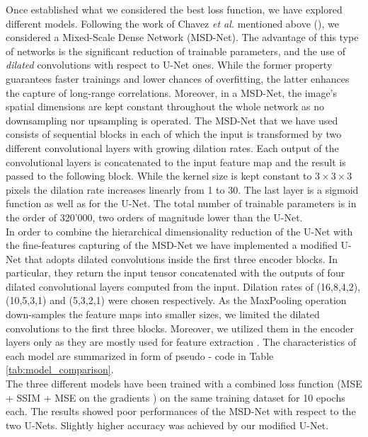Once established what we considered the best loss function, we have explored different models. 
Following the work of Chavez \textit{et al.} mentioned above (\cite{chavez_comparison_2022}), we considered a 
Mixed-Scale Dense Network (MSD-Net). The advantage of this type of networks is the significant reduction of trainable
parameters, and the use of \textit{dilated} convolutions with respect to U-Net ones. While the former property guarantees
faster trainings and lower chances of overfitting, the latter enhances the capture of long-range correlations. Moreover, 
in a MSD-Net, the image's spatial dimensions are kept constant throughout the whole network as no downsampling nor upsampling is operated.
The MSD-Net that we have used consists of sequential blocks in each of which the input is transformed by two different 
convolutional layers with growing dilation rates. Each output of the convolutional layers is concatenated to the input 
feature map and the result is passed to the following block. While the kernel size is kept constant to $3\times3\times3$ pixels
the dilation rate increases linearly from 1 to 30. The last layer is a sigmoid function as well as for the U-Net. 
The total number of trainable parameters is in the order of 320'000, two orders of magnitude lower than the U-Net.
\\
In order to combine the hierarchical dimensionality reduction of the U-Net with the fine-features capturing of the MSD-Net 
we have implemented a modified U-Net that adopts dilated convolutions inside the first three encoder blocks. In particular, 
they return the input tensor concatenated with the outputs of four dilated convolutional layers computed
from the input. Dilation rates of (16,8,4,2), (10,5,3,1) and (5,3,2,1) were chosen respectively. As the MaxPooling 
operation down-samples the feature maps into smaller sizes, we limited the dilated convolutions to the first three 
blocks. Moreover, we utilized them in the encoder layers only as they are mostly used for feature extraction \cite{dilated_conv}.
The characteristics of each model are summarized in form of pseudo - code in Table \ref{tab:model_comparison}.
\\

The three different models have been trained with a combined loss function (MSE + SSIM + MSE on the gradients ) on the 
same training dataset for 10 epochs each.  The results showed poor performances of the MSD-Net with respect to the two 
U-Nets. Slightly higher accuracy was achieved by our modified U-Net. 

